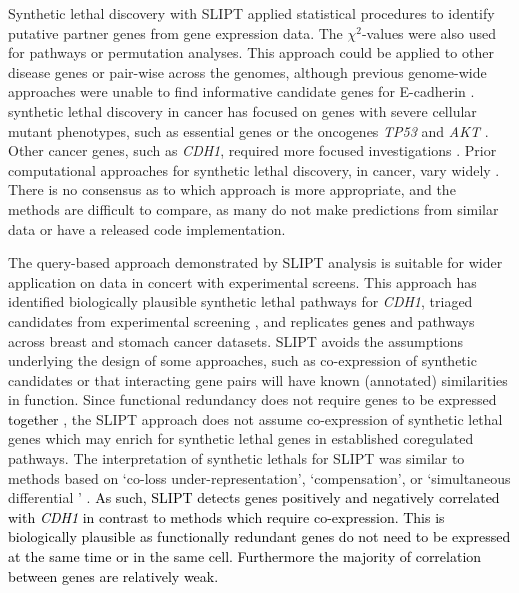 Synthetic lethal discovery  with \gls{SLIPT} applied statistical procedures to identify putative partner genes from \gls{gene expression} data. The $\chi^2$-values were also used for \glspl{pathway} or permutation analyses. This approach could be applied to other disease genes or pair-wise across the \glspl{genome}, although previous \gls{genome}-wide approaches were unable to find informative candidate genes for \gls{E-cadherin} \citep{Lu2015}. \Gls{synthetic lethal} discovery in cancer has focused on genes with severe cellular \gls{mutant} phenotypes, such as \gls{essential} genes or the \glspl{oncogene} \textit{TP53} and \textit{AKT} \citep{Tiong2014, Lu2015, Wang2013}. Other cancer genes, such as \textit{CDH1}, required more focused investigations \citep{Srihari2015, Telford2015}. Prior computational approaches for \gls{synthetic lethal} discovery, in cancer, vary widely \citep{Tiong2014, Jerby2014, Lu2015, Wappett2016}. There is no consensus as to which approach is more appropriate, and the methods are difficult to compare, as many do not make predictions from similar data or have a released code implementation.

The query-based approach demonstrated by \gls{SLIPT} analysis is suitable for wider application on  data in concert with experimental screens. This approach has identified biologically plausible \gls{synthetic lethal} \glspl{pathway} for \textit{CDH1}, triaged candidates from experimental screening \citep{Telford2015}, and replicates \textcolor{black}{genes} and \glspl{pathway} across breast and stomach cancer datasets. \gls{SLIPT} avoids the assumptions underlying the design of some approaches, such as co-expression of synthetic candidates or that interacting gene pairs will have known (annotated) similarities in function. 
%
Since \gls{functional redundancy} does not require genes to be expressed \textcolor{black}{together} \citep{Lu2015}, the \gls{SLIPT} approach does not assume co-expression of \gls{synthetic lethal} genes which may enrich for \gls{synthetic lethal} genes in established coregulated \glspl{pathway}. The interpretation of \glspl{synthetic lethal} for \gls{SLIPT} was similar to methods based on `co-loss under-represent\-at\-ion', `compensation', or `simultaneous differential ' \citep{Tiong2014, Lu2015, Wang2013}. \textcolor{black}{As such, SLIPT detects genes positively and negatively correlated with \textit{CDH1} in contrast to methods which require co-expression. This is biologically plausible as functionally redundant genes do not need to be expressed at the same time or in the same cell. Furthermore the majority of correlation between genes are relatively weak.}

